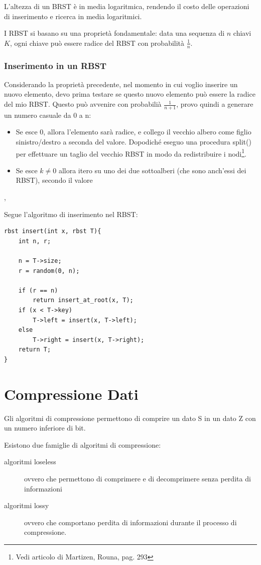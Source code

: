 \documentclass[a4paper,11pt]{book}
\begin{document}
L'altezza di un BRST \`e in media logaritmica, rendendo il costo delle operazioni di inserimento e ricerca in media logaritmici.

I RBST si basano su una propriet\`a fondamentale: data una sequenza di $n$ chiavi $K$, ogni chiave pu\`o essere radice del RBST con probabilit\`a $\frac{1}{n}$.

\subsection{Inserimento in un RBST}

Considerando la propriet\`a precedente, nel momento in cui voglio inserire un nuovo elemento, devo prima testare se questo nuovo elemento pu\`o essere la radice del mio RBST. Questo pu\`o avvenire con probabili\`a $\frac{1}{n+1}$, provo quindi a generare un numero casuale da 0 a n:

\begin{itemize}
\item Se esce 0, allora l'elemento sar\`a radice, e collego il vecchio albero come figlio sinistro/destro a seconda del valore. Dopodich\'e eseguo una procedura \textsf{split()} per effettuare un taglio del vecchio RBST in modo da redistribuire i nodi\footnote{Vedi articolo di Martizen, Rouna, pag. 293}.
\item Se esce $k \neq 0$ allora itero su uno dei due sottoalberi (che sono anch'essi dei RBST), secondo il valore 
\end{itemize}, 

Segue l'algoritmo di inserimento nel RBST:

\begin{lstlisting}
rbst insert(int x, rbst T){
	int n, r;
	
	n = T->size;
	r = random(0, n);
	
	if (r == n)
		return insert_at_root(x, T);
	if (x < T->key)
		T->left = insert(x, T->left);
	else
		T->right = insert(x, T->right);
	return T;
}
\end{lstlisting}


\chapter{Compressione Dati}

Gli algoritmi di compressione permettono di comprire un dato S in un dato Z con un numero inferiore di bit.

Esistono due famiglie di algoritmi di compressione:
\begin{description}
\item[algoritmi loseless] ovvero che permettono di comprimere e di decomprimere senza perdita di informazioni
\item[algoritmi lossy] ovvero che comportano perdita di informazioni durante il processo di compressione.
\end{description}
\end{document}
